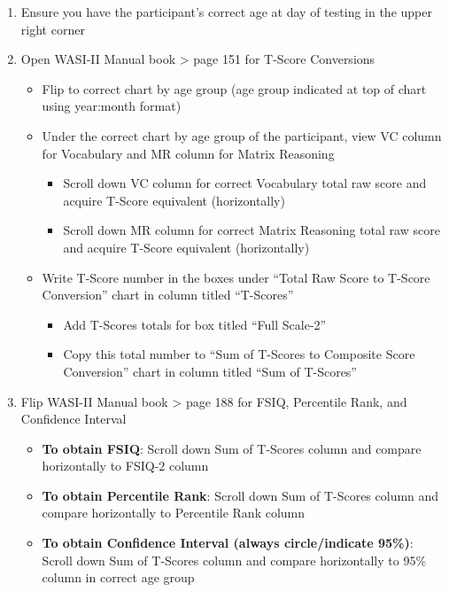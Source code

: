\documentclass[]{book}
\providecommand{\tightlist}{%
  \setlength{\itemsep}{0pt}\setlength{\parskip}{0pt}}
\begin{document}
\begin{enumerate}
\def\labelenumi{\arabic{enumi}.}
\tightlist
\item
  Ensure you have the participant's correct age at day of testing in the upper right corner
\item
  Open WASI-II Manual book \textgreater{} page 151 for T-Score Conversions

  \begin{itemize}
  \tightlist
  \item
    Flip to correct chart by age group (age group indicated at top of chart using year:month format)
  \item
    Under the correct chart by age group of the participant, view VC column for Vocabulary and MR column for Matrix Reasoning

    \begin{itemize}
    \tightlist
    \item
      Scroll down VC column for correct Vocabulary total raw score and acquire T-Score equivalent (horizontally)
    \item
      Scroll down MR column for correct Matrix Reasoning total raw score and acquire T-Score equivalent (horizontally)
    \end{itemize}
  \item
    Write T-Score number in the boxes under ``Total Raw Score to T-Score Conversion'' chart in column titled ``T-Scores''

    \begin{itemize}
    \tightlist
    \item
      Add T-Scores totals for box titled ``Full Scale-2''
    \item
      Copy this total number to ``Sum of T-Scores to Composite Score Conversion'' chart in column titled ``Sum of T-Scores''
    \end{itemize}
  \end{itemize}
\item
  Flip WASI-II Manual book \textgreater{} page 188 for FSIQ, Percentile Rank, and Confidence Interval

  \begin{itemize}
  \tightlist
  \item
    \textbf{To obtain FSIQ}: Scroll down Sum of T-Scores column and compare horizontally to FSIQ-2 column
  \item
    \textbf{To obtain Percentile Rank}: Scroll down Sum of T-Scores column and compare horizontally to Percentile Rank column
  \item
    \textbf{To obtain Confidence Interval (always circle/indicate 95\%)}: Scroll down Sum of T-Scores column and compare horizontally to 95\% column in correct age group
  \end{itemize}
\end{enumerate}
\end{document}
